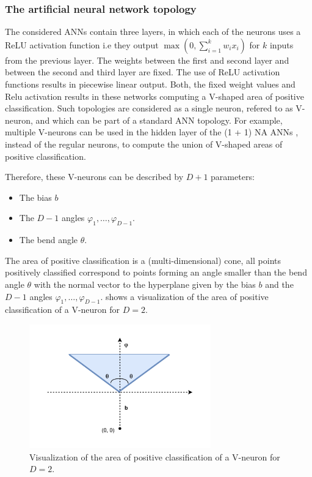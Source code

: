 \subsubsection{The artificial neural network topology}

The considered ANNs contain three layers, in which each of the neurons uses a ReLU activation function i.e they output $\max(0, \sum_{i=1}^k w_i x_i)$ for
$k$ inputs from the previous layer.
The weights between the first and second layer and between the second and third layer are fixed.
The use of ReLU activation functions results in piecewise linear output. Both, the fixed weight values and Relu activation results in these networks computing a V-shaped area of positive classification.
Such topologies are considered as a single neuron, refered to as V-neuron, and which can be part of a standard ANN topology. For example, multiple V-neurons can be used in the hidden layer of the
(1 + 1) NA ANNs \cite{na}, instead of the regular neurons, to compute the union of V-shaped areas of positive classification.


Therefore, these V-neurons can be described by $D + 1$ parameters:

\begin{itemize}
    \item The bias $b$
    \item The $D - 1$ angles $\varphi_1, \ldots, \varphi_{D-1}$.
    \item The bend angle $\theta$.
\end{itemize}

The area of positive classification is a (multi-dimensional) cone, all points positively classified correspond to points forming an angle smaller than the bend
angle $\theta$ with the normal vector to the hyperplane given by the bias $b$ and the $D -1$ angles $\varphi_1, \ldots, \varphi_{D-1}$.
 shows a visualization of the area of positive classification of a V-neuron for $D = 2$.

\begin{figure}
    \centering
    \includegraphics[width=0.7\textwidth]{Pictures/bna_cone}
    \caption{Visualization of the area of positive classification of a V-neuron for $D = 2$.}
    \label{fig:bna-cone}
\end{figure}

